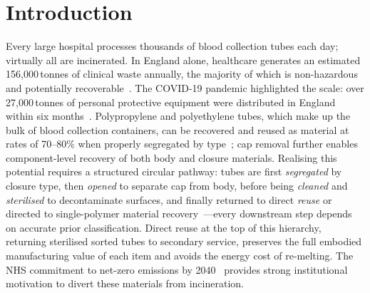 \documentclass{Academic}
\begin{document}
\myabstract{}
\renewcommand{\myTitle}{High-Speed RGB-D Segmentation for Automated Medical Tube Segregation}
\renewcommand{\MyAuthor}{Tadeas Horn}
\renewcommand{\MyDepartment}{Department of Mechanical Engineering}
\renewcommand{\ID}{3035743}
\renewcommand{\Keywords}{Instance Segmentation, Medical Tubes, YOLO, RGB-D Fusion, Circular Economy}
\renewcommand{\MySupervisor}{Shiv Ashutosh Katiyar}
\maketitle
\onehalfspacing
\setlength{\emergencystretch}{3em}
\raggedbottom

\section{Introduction}
\label{sec:introduction}

Every large hospital processes thousands of blood collection tubes each day; virtually all are incinerated. In England alone, healthcare generates an estimated 156,000\,tonnes of clinical waste annually, the majority of which is non-hazardous and potentially recoverable~\supercite{who2024healthcare,windfeld2015medical}. The COVID-19 pandemic highlighted the scale: over 27,000\,tonnes of personal protective equipment were distributed in England within six months~\supercite{rizan2021environmental}. Polypropylene and polyethylene tubes, which make up the bulk of blood collection containers, can be recovered and reused as material at rates of 70--80\% when properly segregated by type~\supercite{lee2004medical,geyer2017plastics}; cap removal further enables component-level recovery of both body and closure materials. Realising this potential requires a structured circular pathway: tubes are first \emph{segregated} by closure type, then \emph{opened} to separate cap from body, before being \emph{cleaned} and \emph{sterilised} to decontaminate surfaces, and finally returned to direct \emph{reuse} or directed to single-polymer material recovery~\supercite{lee2004medical}---every downstream step depends on accurate prior classification. Direct reuse at the top of this hierarchy, returning sterilised sorted tubes to secondary service, preserves the full embodied manufacturing value of each item and avoids the energy cost of re-melting. The NHS commitment to net-zero emissions by 2040~\supercite{nhs2022netzero} provides strong institutional motivation to divert these materials from incineration.
\end{document}
